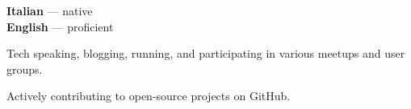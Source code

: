 \documentclass[9pt]{developercv}
\begin{document}
\begin{minipage}[t]{0.25\textwidth}
    \vspace{-\baselineskip}


    \textbf{Italian} --- native\\
    \textbf{English} --- proficient\\
\end{minipage}
\hfill
\begin{minipage}[t]{0.42\textwidth}
    \vspace{-\baselineskip}


    \raggedright
    Tech speaking, blogging, running, and participating in various meetups and user groups.
\end{minipage}
\hfill
\begin{minipage}[t]{0.25\textwidth}
    \vspace{-\baselineskip}


    \raggedright
    Actively contributing to open-source projects on GitHub.
\end{minipage}

\end{document}
